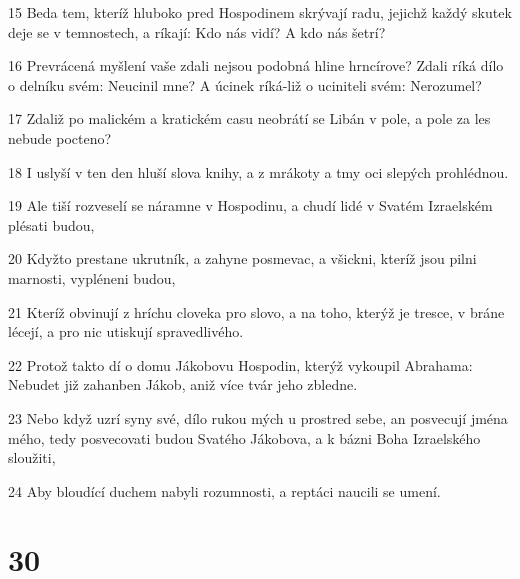 \par 15 Beda tem, kteríž hluboko pred Hospodinem skrývají radu, jejichž každý skutek deje se v temnostech, a ríkají: Kdo nás vidí? A kdo nás šetrí?
\par 16 Prevrácená myšlení vaše zdali nejsou podobná hline hrncírove? Zdali ríká dílo o delníku svém: Neucinil mne? A úcinek ríká-liž o uciniteli svém: Nerozumel?
\par 17 Zdaliž po malickém a kratickém casu neobrátí se Libán v pole, a pole za les nebude pocteno?
\par 18 I uslyší v ten den hluší slova knihy, a z mrákoty a tmy oci slepých prohlédnou.
\par 19 Ale tiší rozveselí se náramne v Hospodinu, a chudí lidé v Svatém Izraelském plésati budou,
\par 20 Kdyžto prestane ukrutník, a zahyne posmevac, a všickni, kteríž jsou pilni marnosti, vypléneni budou,
\par 21 Kteríž obvinují z hríchu cloveka pro slovo, a na toho, kterýž je tresce, v bráne lécejí, a pro nic utiskují spravedlivého.
\par 22 Protož takto dí o domu Jákobovu Hospodin, kterýž vykoupil Abrahama: Nebudet již zahanben Jákob, aniž více tvár jeho zbledne.
\par 23 Nebo když uzrí syny své, dílo rukou mých u prostred sebe, an posvecují jména mého, tedy posvecovati budou Svatého Jákobova, a k bázni Boha Izraelského sloužiti,
\par 24 Aby bloudící duchem nabyli rozumnosti, a reptáci naucili se umení.

\chapter{30}

